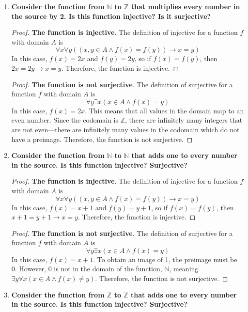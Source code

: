 \documentclass[article, 12pt]{article}
\theoremstyle{definition}
\newcommand{\ints}{\mathbb{Z}}
\newcommand{\nats}{\mathbb{N}}
\begin{document}
\begin{enumerate}[(1)]
\begin{enumerate}[(a)]
\begin{proof}
            \end{proof}
        \end{enumerate}
        \item \textbf{Consider the function from $\nats$ to $\ints$ that multiplies every number in the source by 2. Is this function injective? Is it surjective?}
        \begin{proof}
            \textbf{The function is injective}. The definition of injective for a function $f$ with domain $A$ is \[ \forall x \forall y((x,y \in A \land f(x) = f(y)) \to x = y) \] In this case, $f(x) = 2x$ and $f(y) = 2y$, so if $f(x) = f(y)$, then $2x = 2y \to x = y$. Therefore, the function is injective.
        \end{proof}
        \begin{proof}
            \textbf{The function is not surjective}. The definition of surjective for a function $f$ with domain $A$ is \[ \forall y \exists x(x \in A \land f(x) = y) \] In this case, $f(x) = 2x$. This means that all values in the domain map to an even number. Since the codomain is $\ints$, there are infinitely many integers that are not even---there are infinitely many values in the codomain which do not have a preimage. Therefore, the function is not surjective.
        \end{proof}
        \item \textbf{Consider the function from $\nats$ to $\nats$ that adds one to every number in the source. Is this function injective? Surjective?}
        \begin{proof}
            \textbf{The function is injective}. The definition of injective for a function $f$ with domain $A$ is \[ \forall x \forall y((x,y \in A \land f(x) = f(y)) \to x = y) \] In this case, $f(x) = x+1$ and $f(y) = y+1$, so if $f(x) = f(y)$, then $x+1 = y+1 \to x = y$. Therefore, the function is injective.
        \end{proof}
        \begin{proof}
            \textbf{The function is not surjective}. The definition of surjective for a function $f$ with domain $A$ is \[ \forall y \exists x(x \in A \land f(x) = y) \] In this case, $f(x) = x+1$. To obtain an image of 1, the preimage must be 0. However, 0 is not in the domain of the function, $\nats$, meaning $\exists y \forall x (x \in A \land f(x) \neq y)$. Therefore, the function is not surjective.
        \end{proof}
        \item \textbf{Consider the function from $\ints$ to $\ints$ that adds one to every number in the source. Is this function injective? Surjective?}

\end{enumerate}
\end{document}
